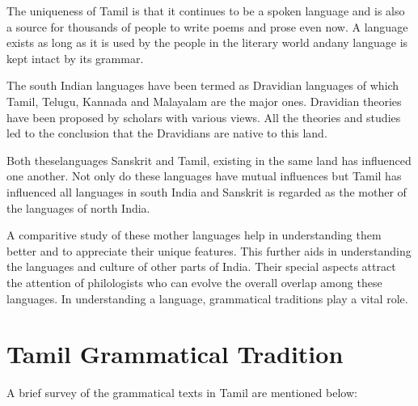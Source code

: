 The uniqueness of Tamil is that it continues to be a spoken language and is also a source for thousands of people to write poems and prose even now. A language exists as long as it is used by the people in the literary world andany language is kept intact by its grammar.

The south Indian languages have been termed as Dravidian languages of which Tamil, Telugu, Kannada and Malayalam are the major ones. Dravidian theories have been proposed by scholars with various views. All the theories and studies led to the conclusion that the Dravidians are native to this land.

Both theselanguages Sanskrit and Tamil, existing in the same land has influenced one another. Not only do these languages have mutual influences but Tamil has influenced all languages in south India and Sanskrit is regarded as the mother of the languages of north India.

A comparitive study of these mother languages help in understanding them better and to appreciate their unique features. This further aids in understanding the languages and culture of other parts of India. Their special aspects attract the attention of philologists who can evolve the overall overlap among these languages. In understanding a language, grammatical traditions play a vital role.


\section*{Tamil Grammatical Tradition}

A brief survey of the grammatical texts in Tamil are mentioned below:

